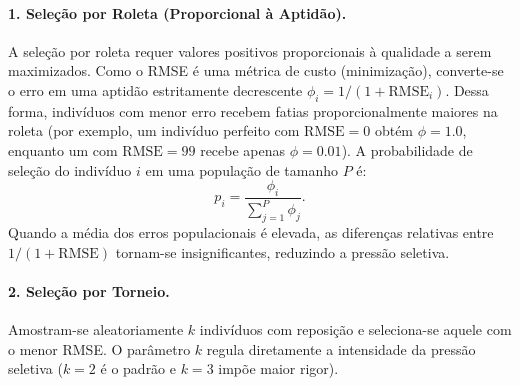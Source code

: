 \paragraph{1. Seleção por Roleta (Proporcional à Aptidão).}
A seleção por roleta requer valores positivos proporcionais à qualidade a serem
maximizados. Como o RMSE é uma métrica de custo (minimização), converte-se o
erro em uma aptidão estritamente decrescente $\phi_i = 1 / (1 + \mathrm{RMSE}_i)$.
Dessa forma, indivíduos com menor erro recebem fatias proporcionalmente maiores
na roleta (por exemplo, um indivíduo perfeito com $\mathrm{RMSE}=0$ obtém
$\phi=1.0$, enquanto um com $\mathrm{RMSE}=99$ recebe apenas $\phi=0.01$). A
probabilidade de seleção do indivíduo $i$ em uma população de tamanho $P$ é:
\begin{equation}
  p_i = \frac{\phi_i}{\sum_{j=1}^{P} \phi_j}.
\end{equation}
Quando a média dos erros populacionais é elevada, as diferenças relativas
entre $1/(1+\text{RMSE})$ tornam-se insignificantes, reduzindo a pressão
seletiva.

\paragraph{2. Seleção por Torneio.}
Amostram-se aleatoriamente $k$ indivíduos com reposição e seleciona-se aquele
com o menor RMSE. O parâmetro $k$ regula diretamente a intensidade da pressão
seletiva ($k=2$ é o padrão e $k=3$ impõe maior rigor).

